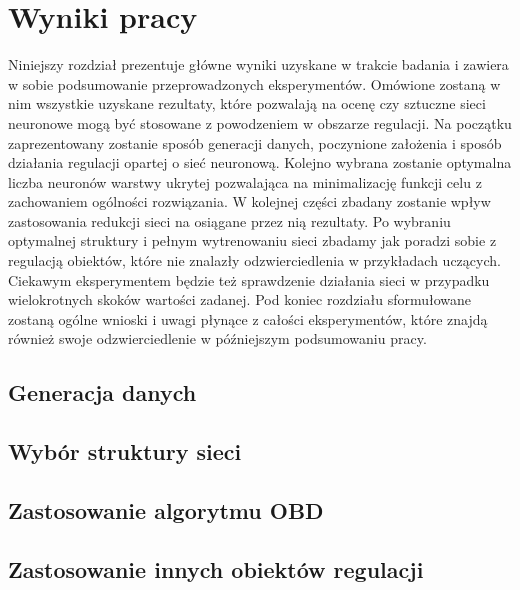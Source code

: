 \newpage %
\section{Wyniki pracy}
Niniejszy rozdział prezentuje główne wyniki uzyskane w trakcie badania i zawiera w sobie podsumowanie przeprowadzonych eksperymentów. Omówione zostaną w nim wszystkie uzyskane rezultaty, które pozwalają na ocenę czy sztuczne sieci neuronowe mogą być stosowane z powodzeniem w obszarze regulacji. Na początku zaprezentowany zostanie sposób generacji danych, poczynione założenia i sposób działania regulacji opartej o sieć neuronową. Kolejno wybrana zostanie optymalna liczba neuronów warstwy ukrytej pozwalająca na minimalizację funkcji celu z zachowaniem ogólności rozwiązania. W kolejnej części zbadany zostanie wpływ zastosowania redukcji sieci na osiągane przez nią rezultaty. Po wybraniu optymalnej struktury i pełnym wytrenowaniu sieci zbadamy jak poradzi sobie z regulacją obiektów, które nie znalazły odzwierciedlenia w przykładach uczących. Ciekawym eksperymentem będzie też sprawdzenie działania sieci w przypadku wielokrotnych skoków wartości zadanej. Pod koniec rozdziału sformułowane zostaną ogólne wnioski i uwagi płynące z całości eksperymentów, które znajdą również swoje odzwierciedlenie w późniejszym podsumowaniu pracy.

\subsection{Generacja danych}

\subsection{Wybór struktury sieci}

\subsection{Zastosowanie algorytmu OBD}

\subsection{Zastosowanie innych obiektów regulacji}
